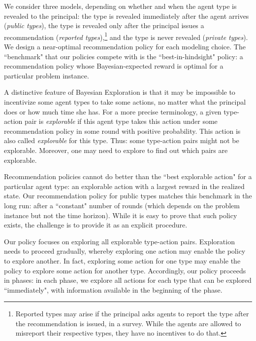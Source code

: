 We consider three models, depending on whether and when the agent type is revealed to the principal: the type is revealed immediately after the agent arrives (\emph{public types}), the type is revealed only after the principal issues a recommendation (\emph{reported types}),\footnote{Reported types may arise if
the principal asks agents to report the type after the recommendation is issued, \eg in a survey. While the agents are allowed to misreport their respective types, they have no incentives to do that.}
and the type is never revealed (\emph{private types}).
%
We design a near-optimal recommendation policy for each modeling choice. The ``benchmark" that our policies compete with is the ``best-in-hindsight"
policy: a recommendation policy whose Bayesian-expected reward is optimal for a particular problem instance.


A distinctive feature of Bayesian Exploration is that it may be impossible to incentivize some agent types to take some actions, no matter what the principal does or how much time she has. For a more precise terminology, a given type-action pair is \emph{explorable} if this agent type takes this action under some recommendation policy in some round with positive probability. This action is also called \emph{explorable} for this type. Thus: some type-action pairs might not be explorable. Moreover, one may need to explore to find out which pairs are explorable. 

Recommendation policies cannot do better than the ``best explorable action" for a particular agent type: an explorable action with a largest reward in the realized state.  Our recommendation policy for public types matches this benchmark in the long run: after a ``constant" number of rounds (which depends on the problem instance but not the time horizon). While it is easy to prove that such policy exists, the challenge is to provide it as an explicit procedure. 

Our policy focuses on exploring all explorable type-action pairs. Exploration needs to proceed gradually, whereby exploring one action may enable the policy to explore another. In fact, exploring some action for one type may enable the policy to explore some action for another type. Accordingly, our policy proceeds in phases: in each phase, we explore all actions for each type that can be explored ``immediately", with information available in the beginning of the phase.


